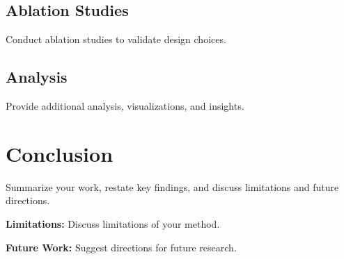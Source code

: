 \documentclass[10pt,twocolumn,letterpaper]{article}
\begin{document}
\subsection{Ablation Studies}

Conduct ablation studies to validate design choices.

\subsection{Analysis}

Provide additional analysis, visualizations, and insights.

\section{Conclusion}
\label{sec:conclusion}

Summarize your work, restate key findings, and discuss limitations and future directions.

\textbf{Limitations:} Discuss limitations of your method.

\textbf{Future Work:} Suggest directions for future research.

{\small


}
\end{document}
